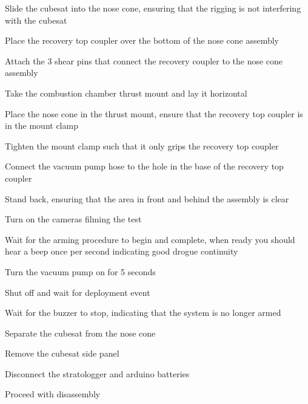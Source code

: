 \begin{checklist}
    \item \auth{} Slide the cubesat into the nose cone, ensuring that the rigging is not interfering with the cubesat
    \item \auth{} Place the recovery top coupler over the bottom of the nose cone assembly
    \item \auth{} Attach the 3 shear pins that connect the recovery coupler to the nose cone assembly
    \item \auth{} Take the combustion chamber thrust mount and lay it horizontal
    \item \auth{} Place the nose cone in the thrust mount, ensure that the recovery top coupler is in the mount clamp
    \item \auth{} Tighten the mount clamp such that it only grips the recovery top coupler
    \item \auth{} Connect the vacuum pump hose to the hole in the base of the recovery top coupler
    \item \auth{} Stand back, ensuring that the area in front and behind the assembly is clear
    \item \auth{} Turn on the cameras filming the test
    \item \auth{} Wait for the arming procedure to begin and complete, when ready you should hear a beep once per second indicating good drogue continuity
    \item \auth{} Turn the vacuum pump on for 5 seconds
    \item \auth{} Shut off and wait for deployment event
    \item \auth{} Wait for the buzzer to stop, indicating that the system is no longer armed
    \item \auth{} Separate the cubesat from the nose cone
    \item \auth{} Remove the cubesat side panel
    \item \auth{} Disconnect the stratologger and arduino batteries
    \item \auth{} Proceed with disassembly
\end{checklist}
\setcounter{checklistnum}{0}


